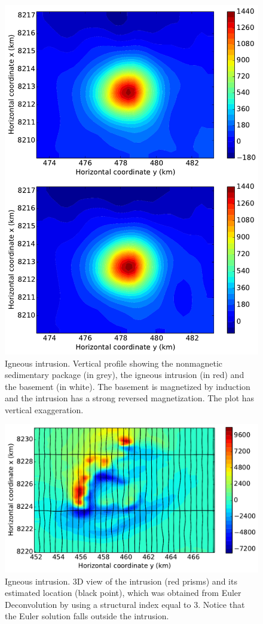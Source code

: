 \documentclass[journal abbreviation, npg]{copernicus}
\begin{document}
\begin{figure}[t]
\includegraphics[width=120mm]{Figures/npgd-2014-0069-f10}
\caption{Igneous intrusion. Vertical profile showing the 
nonmagnetic sedimentary package (in grey), the igneous intrusion
(in red) and the basement (in white). The basement is magnetized by 
induction and the intrusion has a strong reversed magnetization. The
plot has vertical exaggeration.}
\label{fig:intrusion-profile}
\end{figure}

\begin{figure}[t]
\includegraphics[width=120mm]{Figures/npgd-2014-0069-f11}
\caption{Igneous intrusion. 3D view of the intrusion (red prisms)
and its estimated location (black point), which was obtained from
Euler Deconvolution by using a structural index equal to 3. Notice 
that the Euler solution falls outside the intrusion.}
\label{fig:intrusion-euler}
\end{figure}
\end{document}
